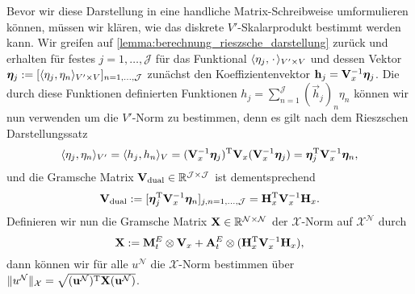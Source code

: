 \documentclass[../main.tex]{subfiles}
\begin{document}
Bevor wir diese Darstellung in eine handliche Matrix-Schreibweise umformulieren können, müssen wir klären, wie das diskrete $V'$-Skalarprodukt bestimmt werden kann.
Wir greifen auf \cref{lemma:berechnung_rieszsche_darstellung} zurück und erhalten für festes $j = 1, \dots, \mathcal J$ für das Funktional $\langle\eta_{j},{\mkern2mu\cdot\mkern2mu}\rangle_{V' \times V}$ und dessen Vektor $\bm \eta_{j} := [\langle\eta_{j},\eta_{n}\rangle_{V' \times V}]_{n = 1, \dots, \mathcal J}$ zunächst den Koeffizientenvektor $\mathbf{h}_{j} = \mathbf{V}_{x}^{-1} \bm \eta_{j}$.
Die durch diese Funktionen definierten Funktionen $h_{j} = \sum_{n = 1}^{\mathcal J} (\vec{h}_{j})_{n} \eta_{n}$ können wir nun verwenden um die $V'$-Norm zu bestimmen, denn es gilt nach dem Rieszschen Darstellungssatz
\begin{equation}
    \langle\eta_{j},\eta_{n}\rangle_{V'} = \langle h_{j},h_{n}\rangle_{V} = (\mathbf{V}_{x}^{-1} \bm \eta_{j})^{\mathrm{T}} \mathbf{V}_{x} (\mathbf{V}_{x}^{-1} \bm \eta_{j}) = \bm{\eta}_{j}^{\mathrm{T}} \mathbf{V}_{x}^{-1} \bm{\eta}_{n},
\end{equation}
und die Gramsche Matrix $\mathbf{V}_{\mathrm{dual}} \in \mathbb{R}^{\mathcal J \times \mathcal J}$ ist dementsprechend
\begin{equation}
    \mathbf{V}_{\mathrm{dual}} := [\bm{\eta}_{j}^{\mathrm{T}} \mathbf{V}_{x}^{-1} \bm{\eta}_{n}]_{j,n = 1, \dots, \mathcal J} = \mathbf{H}_{x}^{\mathrm{T}} \mathbf{V}_{x}^{-1} \mathbf{H}_{x}.
\end{equation}
Definieren wir nun die Gramsche Matrix $\mathbf{X} \in \mathbb{R}^{\mathcal N \times \mathcal N}$ der $\mathcal X$-Norm auf $\mathcal X^{\mathcal N}$ durch
\begin{equation}
    \mathbf{X} := \mathbf{M}^{E}_{t} \otimes \mathbf{V}_{x} + \mathbf{A}^{E}_{t} \otimes (\mathbf{H}_{x}^{\mathrm{T}} \mathbf{V}_{x}^{-1} \mathbf{H}_{x}),
\end{equation}
dann können wir für alle $u^{\mathcal N}$ die $\mathcal X$-Norm bestimmen über $\lVert u^{\mathcal N}\rVert_{\mathcal X} = \sqrt{(\mathbf{u}^{\mathcal N})^{\mathrm{T}} \mathbf{X} (\mathbf{u}^{\mathcal N})}$.
\end{document}

